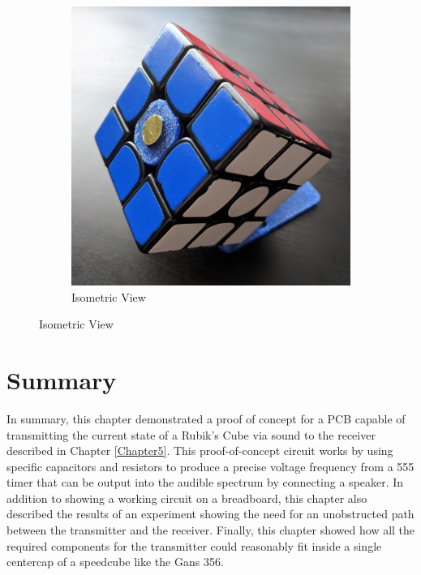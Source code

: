 \begin{figure}[h]
\begin{subfigure}{.30\textwidth}
    \end{subfigure}
    \begin{subfigure}{.30\textwidth}
        \centering
        \caption{Isometric View}
        \label{fig:core-placement-isometric}
        \includegraphics[width=\linewidth]{Figures/6 PCB Design/core_placement_isometric_square.jpg}
    \end{subfigure}
\end{figure}


\section{Summary}

In summary, this chapter demonstrated a proof of concept for a PCB
capable of transmitting the current state of a Rubik's Cube via sound
to the receiver described in Chapter \ref{Chapter5}. This
proof-of-concept circuit works by using specific capacitors and
resistors to produce a precise voltage frequency from a 555 timer that
can be output into the audible spectrum by connecting a speaker. In
addition to showing a working circuit on a breadboard, this chapter
also described the results of an experiment showing the need for an
unobstructed path between the transmitter and the receiver. Finally,
this chapter showed how all the required components for the transmitter
could reasonably fit inside a single centercap of a speedcube like the
Gans 356.
